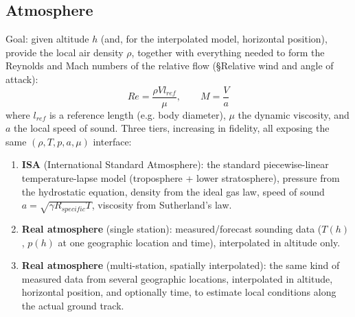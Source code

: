 \documentclass[10pt]{extarticle}
\numberwithin{equation}{subsubsection}
\begin{document}
\subsection{Atmosphere}
Goal: given altitude $h$ (and, for the interpolated model, horizontal position), provide the
local air density $\rho$, together with everything needed to form the Reynolds and Mach numbers
of the relative flow (\S Relative wind and angle of attack):
\begin{equation}
    Re = \frac{\rho V l_{ref}}{\mu}, \qquad M = \frac{V}{a}
\end{equation}
where $l_{ref}$ is a reference length (e.g. body diameter), $\mu$ the dynamic viscosity, and $a$
the local speed of sound. Three tiers, increasing in fidelity, all exposing the same
$(\rho, T, p, a, \mu)$ interface:
\begin{enumerate}
    \item \textbf{ISA} (International Standard Atmosphere): the standard piecewise-linear
    temperature-lapse model (troposphere + lower stratosphere), pressure from the hydrostatic
    equation, density from the ideal gas law, speed of sound $a = \sqrt{\gamma R_{specific} T}$,
    viscosity from Sutherland's law.
    \item \textbf{Real atmosphere} (single station): measured/forecast sounding data ($T(h)$,
    $p(h)$ at one geographic location and time), interpolated in altitude only.
    \item \textbf{Real atmosphere} (multi-station, spatially interpolated): the same kind of
    measured data from several geographic locations, interpolated in altitude, horizontal
    position, and optionally time, to estimate local conditions along the actual ground track.
\end{enumerate}
\end{document}
